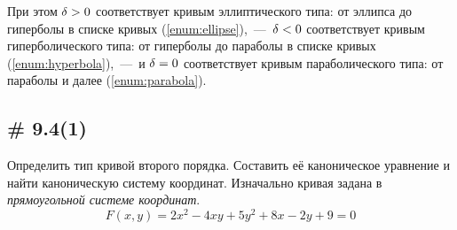 \documentclass[a4paper,12pt]{article}
\begin{document}
  При этом $\delta \hm> 0$ соответствует кривым эллиптического типа: от эллипса до гиперболы в списке кривых (\ref{enum:ellipse}),~---~$\delta \hm< 0$ соответствует кривым гиперболического типа: от гиперболы до параболы в списке кривых (\ref{enum:hyperbola}),~---~и $\delta \hm= 0$ соответствует кривым параболического типа: от параболы и далее (\ref{enum:parabola}).


  \subsection{\# 9.4(1)}
  
  Определить тип кривой второго порядка.
  Составить её каноническое уравнение и найти каноническую систему координат.
  Изначально кривая задана в \emph{прямоугольной системе координат}.
  \begin{equation}\label{eq:problem-9-4}
    F(x, y) = 2x^2 - 4xy + 5y^2 + 8x - 2y + 9 = 0
  \end{equation}
  
\end{document}
